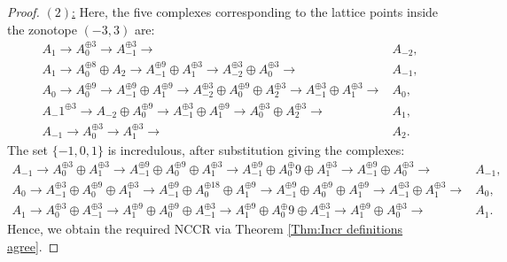 \documentclass[reqno, 12pt]{amsart}
\theoremstyle{definition}
\numberwithin{equation}{section}
\begin{document}
\begin{proof}
\underline{$(2)$:}
Here, the five complexes corresponding to the lattice points inside the zonotope $(-3,3)$ are:
\begin{align*}
    A_1\longrightarrow A_0^{\oplus 3}\longrightarrow A_{-1}^{\oplus 3}\longrightarrow & A_{-2},\\
    A_1\longrightarrow A_0^{\oplus 8}\oplus A_2\longrightarrow A_{-1}^{\oplus 9}\oplus A_1^{\oplus 3}\longrightarrow A_{-2}^{\oplus 3}\oplus A_0^{\oplus 3}\longrightarrow & A_{-1},\\
    A_0\longrightarrow A_0^{\oplus 9}\longrightarrow A_{-1}^{\oplus 9}\oplus A_1^{\oplus 9}\longrightarrow A_{-2}^{\oplus 3}\oplus A_0^{\oplus 9}\oplus A_2^{\oplus 3}\longrightarrow A_{-1}^{\oplus 3}\oplus A_1^{\oplus 3}\longrightarrow & A_0,\\
    A_-1^{\oplus 3}\longrightarrow A_{-2}\oplus A_0^{\oplus 9}\longrightarrow A_{-1}^{\oplus 3}\oplus A_1^{\oplus 9}\longrightarrow A_0^{\oplus 3}\oplus A_2^{\oplus 3}\longrightarrow &A_1,\\
    A_{-1}\longrightarrow A_0^{\oplus 3}\longrightarrow A_1^{\oplus 3}\longrightarrow & A_2.
\end{align*}
The set $\{-1,0,1\}$ is incredulous, after substitution giving the complexes:
\begin{align*}
    A_{-1}\longrightarrow A_0^{\oplus 3}\oplus A_1^{\oplus 3}\longrightarrow A_{-1}^{\oplus 9}\oplus A_0^{\oplus 9}\oplus A_1^{\oplus 3}\longrightarrow A_{-1}^{\oplus 9}\oplus A_0^{\oplus }9\oplus A_1^{\oplus 3}\longrightarrow A_{-1}^{\oplus 9}\oplus A_0^{\oplus 3}\longrightarrow & A_{-1},\\
    A_0\longrightarrow A_{-1}^{\oplus 3}\oplus A_0^{\oplus 9}\oplus A_1^{\oplus 3}\longrightarrow A_{-1}^{\oplus 9}\oplus A_0^{\oplus 18}\oplus A_1^{\oplus 9}\longrightarrow A_{-1}^{\oplus 9}\oplus A_0^{\oplus 9}\oplus A_1^{\oplus 9}\longrightarrow A_{-1}^{\oplus 3}\oplus A_1^{\oplus 3}\longrightarrow & A_0,\\
    A_{1}\longrightarrow A_0^{\oplus 3}\oplus A_{-1}^{\oplus 3}\longrightarrow A_{1}^{\oplus 9}\oplus A_0^{\oplus 9}\oplus A_{-1}^{\oplus 3}\longrightarrow A_{1}^{\oplus 9}\oplus A_0^{\oplus }9\oplus A_{-1}^{\oplus 3}\longrightarrow A_{1}^{\oplus 9}\oplus A_0^{\oplus 3}\longrightarrow & A_{1}.
\end{align*}
Hence, we obtain the required NCCR via Theorem \ref{Thm:Incr definitions agree}.
\end{proof}
\end{document}
